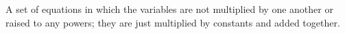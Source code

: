 A set of equations in which the variables are not multiplied by one another
or raised to any powers; they are just multiplied by constants and added together.